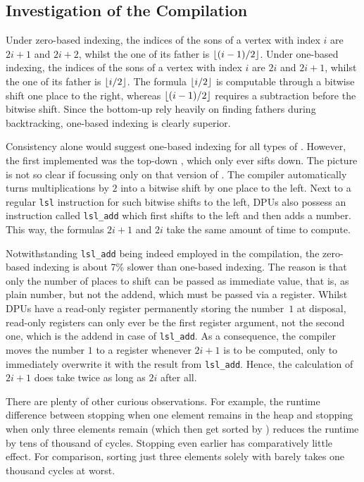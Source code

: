 \subsection*{Investigation of the Compilation}
\label{sec:tasklet:heap:compilation}

Under zero-based indexing, the indices of the sons of a vertex with index \(i\) are \(2 i + 1\) and \(2 i + 2\), whilst the one of its father is \(\lfloor(i - 1)/ 2\rfloor\).
Under one-based indexing, the indices of the sons of a vertex with index \(i\) are \(2 i\) and \(2 i + 1\), whilst the one of its father is \(\lfloor i / 2\rfloor\).
The formula \(\lfloor i / 2\rfloor\) is computable through a bitwise shift one place to the right, whereas \(\lfloor(i - 1)/ 2\rfloor\) requires a subtraction before the bitwise shift.
Since the bottom-up \HS*{} rely heavily on finding fathers during backtracking, one-based indexing is clearly superior.

Consistency alone would suggest one-based indexing for all types of \HS{}.
However, the first \HS{} implemented was the top-down \HS{}, which only ever sifts down.
The picture is not so clear if focussing only on that version of \HS{}.
The compiler automatically turns multiplications by \(2\) into a bitwise shift by one place to the left.
Next to a regular \lstinline|lsl| instruction for such bitwise shifts to the left, DPUs also possess an instruction called \lstinline|lsl_add| which first shifts to the left and then adds a number.
This way, the formulas \(2i + 1\) and \(2i\) take the same amount of time to compute.

Notwithstanding \lstinline|lsl_add| being indeed employed in the compilation, the zero-based indexing is about 7\% slower than one-based indexing.
The reason is that only the number of places to shift can be passed as immediate value, that is, as plain number, but not the addend, which must be passed via a register.
Whilst DPUs have a read-only register permanently storing the number~\(1\) at disposal, read-only registers can only ever be the first register argument, not the second one, which is the addend in case of \lstinline|lsl_add|.
As a consequence, the compiler moves the number \(1\) to a register whenever \(2i + 1\) is to be computed, only to immediately overwrite it with the result from \lstinline|lsl_add|.
Hence, the calculation of \(2i + 1\) does take twice as long as \(2 i\) after all.

There are plenty of other curious observations.
For example, the runtime difference between stopping \HS{} when one element remains in the heap and stopping \HS{} when only three elements remain (which then get sorted by \IS{}) reduces the runtime by tens of thousand of cycles.
Stopping \HS{} even earlier has comparatively little effect.
For comparison, sorting just three elements solely with \HS{} barely takes one thousand cycles at worst.

